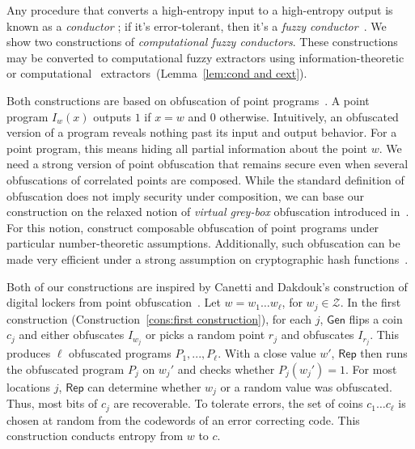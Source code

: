 \documentclass[11pt]{article}
\newcommand{\lemref}[1]{\mbox{Lemma~\ref{#1}}}
\newcommand{\consref}[1]{\mbox{Construction~\ref{#1}}}
\newcommand{\class}[1]{{\ensuremath{\mathsf{#1}}}}
\newcommand{\gen}{\ensuremath{\class{Gen}}\xspace}
\newcommand{\rep}{\ensuremath{\class{Rep}}\xspace}
\begin{document}
Any procedure that converts a high-entropy input to a high-entropy output is known as a \emph{conductor} \cite{CRVW02}; if it's error-tolerant, then it's a \emph{fuzzy conductor}~\cite{KanukurthiR09}. We show two constructions of \emph{computational fuzzy conductors}.
These constructions may be converted to computational fuzzy extractors using information-theoretic~\cite{nisan1993randomness} or computational~\cite{krawczyk2010cryptographic} extractors~(\lemref{lem:cond and cext}).

Both constructions are based on  obfuscation of point programs~\cite{canetti1997towards}.  A point program $I_w(x)$ outputs $1$ if $x=w$ and $0$ otherwise.  Intuitively, an obfuscated version of a program reveals nothing past its input and output behavior.  For a point program, this means hiding all partial information about the point $w$.
We need a strong version of point obfuscation that remains secure even when several obfuscations of correlated points are composed. While the standard definition of obfuscation \cite{barak2001possibility} does not imply security under composition, we can base our construction on the relaxed notion of \emph{virtual grey-box} obfuscation introduced in~\cite{bitansky2010strong}. For this notion, \cite{bitansky2010strong} construct composable obfuscation of point programs under particular number-theoretic assumptions. Additionally, such obfuscation can be made very efficient under a strong assumption on cryptographic hash functions~\cite{canetti1997towards}.

Both of our constructions are inspired by Canetti and Dakdouk's construction of digital lockers from point obfuscation~\cite{canetti2008obfuscating}.  Let $w=w_1 \dots w_\ell$, for $w_j\in \mathcal{Z}$. In the first construction (\consref{cons:first construction}), for each $j$, $\gen$ flips a coin $c_j$ and either obfuscates $I_{w_j}$ or picks a random point $r_j$ and obfuscates $I_{r_j}$.  This produces $\ell$ obfuscated programs $P_1,..., P_\ell$.  With a close value $w'$, $\rep$ then runs the obfuscated program $P_j$ on $w_j'$ and checks whether $P_j(w_j')=1$.  For most locations $j$, \rep can determine whether $w_j$ or a random value was obfuscated.  Thus, most bits of $c_j$ are recoverable. To tolerate errors,  the set of coins $c_1\dots c_\ell$  is chosen at random from the codewords of an error correcting code. This construction conducts entropy from $w$ to $c$.
\end{document}
